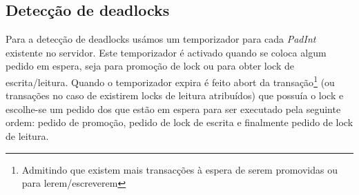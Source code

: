 \subsection{Detecção de deadlocks}

Para a detecção de deadlocks usámos um temporizador para cada \textit{PadInt} existente no servidor. Este temporizador é activado quando se coloca algum pedido em espera, seja para promoção de lock ou para obter lock de escrita/leitura. Quando o temporizador expira é feito abort da transação\footnote{Admitindo que existem mais transacções à espera de serem promovidas ou para lerem/escreverem} (ou transações no caso de existirem locks de leitura atribuídos) que possuía o lock e escolhe-se um pedido dos que estão em espera para ser executado pela seguinte ordem: pedido de promoção, pedido de lock de escrita e finalmente pedido de lock de leitura.
